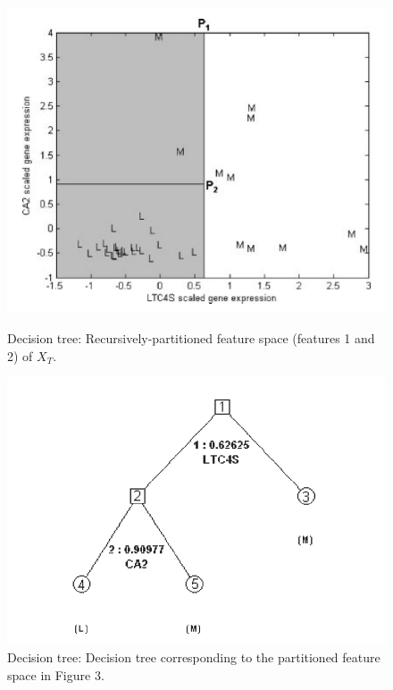 \documentclass[a4paper]{article}
\begin{document}
\begin{figure}[H]
    \centering
    \begin{minipage}{0.48\textwidth}
      \centering
      \includegraphics[width=\linewidth]{./images/Decision tree-Recursively-partitioned feature space.png}
      \caption{Decision tree: Recursively-partitioned feature space (features 1 and 2) of $X_T$.\cite{ref_dt1}}
      \label{fig.Decision tree-data}
    \end{minipage}\hfill
    \begin{minipage}{0.48\textwidth}
      \centering
      \includegraphics[width=\linewidth]{./images/Decision tree.png}
      \caption{Decision tree: Decision tree corresponding to the partitioned feature space in Figure 3.\cite{ref_dt1}}
      \label{fig.Decision tree}
    \end{minipage}
\end{figure}
\end{document}
